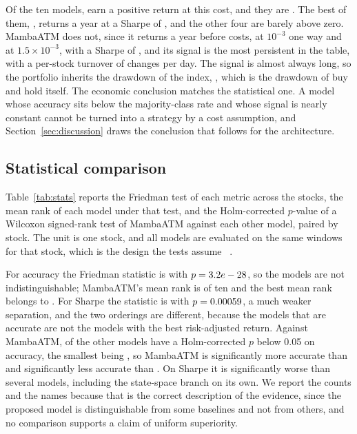 \documentclass[pdflatex,sn-mathphys-ay]{sn-jnl}
\theoremstyle{thmstyleone}%
\theoremstyle{thmstyletwo}%
\theoremstyle{thmstyletwo}%
\begin{document}
Of the ten models, \nPortProfit{} earn a positive return at this cost, and they are \portProfitNames.
The best of them, \portBestName, returns \portAnnBest{} a year at a Sharpe of \portShBest, and the
other four are barely above zero. MambaATM does not, since it returns
\portAnnPropZero{} a year before costs, \portAnnProp{} at $10^{-3}$ one way and \portAnnPropHigh{} at
$1.5\times10^{-3}$, with a Sharpe of \portShProp, and its signal is the most persistent in the table,
with a per-stock turnover of \turnProp{} changes per day. The signal is almost always long, so the
portfolio inherits the drawdown of the index, \portDDProp, which is the drawdown of buy and hold
itself. The economic conclusion
matches the statistical one. A model whose accuracy sits below the majority-class rate and whose
signal is nearly constant cannot be turned into a strategy by a cost assumption, and
Section~\ref{sec:discussion} draws the conclusion that follows for the architecture.

\begin{table}[tbp]
	\centering
	\caption{Equal-weight portfolio of the panel, net of one-way cost per position change, against buy and hold of the same stocks over the same days.}
	\label{tab:portfolio}
	
\end{table}

\subsection{Statistical comparison}

Table~\ref{tab:stats} reports the Friedman test of each metric across the \nStocks{} stocks, the
mean rank of each model under that test, and the Holm-corrected $p$-value of a Wilcoxon signed-rank
test of MambaATM against each other model, paired by stock. The unit is one stock, and all models
are evaluated on the same windows for that stock, which is the design the tests assume
~\citep{demsar2006statistical}.

For accuracy the Friedman statistic is \friedmanAcc{} with $p = 3.2e-28$, so the models are
not indistinguishable; MambaATM's mean rank is \rankPropAcc{} of ten and the best mean rank belongs
to \rankBestAccName. For Sharpe the statistic is \friedmanSh{} with $p = 0.00059$, a much weaker
separation, and the two orderings are different, because the models that are accurate are not the
models with the best risk-adjusted return. Against MambaATM, \nSignificantVsProp{} of the
\nCompared{} other models have a Holm-corrected $p$ below 0.05 on accuracy, the smallest being
\pMinVsProp, so MambaATM is significantly more accurate than \accBeatsName{} and significantly less
accurate than \accLosesToName. On Sharpe it is significantly worse than several models, including the
state-space branch on its own. We report the counts and the names because that is the correct
description of the evidence, since the proposed model is distinguishable from some baselines and not
from others, and no comparison supports a claim of uniform superiority.
\end{document}

